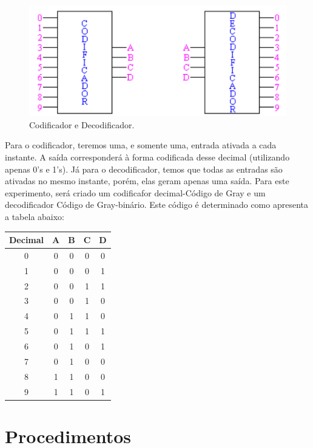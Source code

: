 \documentclass[12pt]{article}
\begin{document}
\begin{figure}[H]
	\centering
	\includegraphics[width=.5\textwidth]{coddecod.jpg}
	\caption{Codificador e Decodificador.}
	\label{fig:exemplo}
\end{figure}


Para o codificador, teremos uma, e somente uma, entrada ativada a cada instante. A saída corresponderá à forma codificada desse decimal (utilizando apenas 0’s e 1’s). Já para o decodificador, temos que todas as entradas são ativadas no mesmo instante, porém, elas geram apenas uma saída. 
Para este experimento, será criado um codificafor decimal-Código de Gray e um decodificador Código de Gray-binário. Este código é determinado como apresenta a tabela abaixo:

\begin{table}[H]
	\centering
	\begin{tabular}{|c|c|c|c|c|}
		\cline{1-5}
		\multicolumn{1}{|c|}{Decimal} & \multicolumn{1}{|c|}{A} & \multicolumn{1}{|c|}{B} & \multicolumn{1}{|c|}{C} & \multicolumn{1}{|c|}{D}\\
		\hline
		0 & 0 & 0 & 0 & 0 \\
		\hline
		1 & 0 & 0 & 0 & 1 \\
		\hline
		2 & 0 & 0 & 1 & 1 \\
		\hline
		3 & 0 & 0 & 1 & 0 \\
		\hline
		4 & 0 & 1 & 1 & 0 \\
		\hline
		5 & 0 & 1 & 1 & 1 \\
		\hline
		6 & 0 & 1 & 0 & 1 \\
		\hline
		7 & 0 & 1 & 0 & 0 \\
		\hline
		8 & 1 & 1 & 0 & 0 \\
		\hline
		9 & 1 & 1 & 0 & 1 \\
		\hline
	\end{tabular}
	
\end{table} 




\section{Procedimentos}
\label{sec:Procedimentos}
\end{document}
